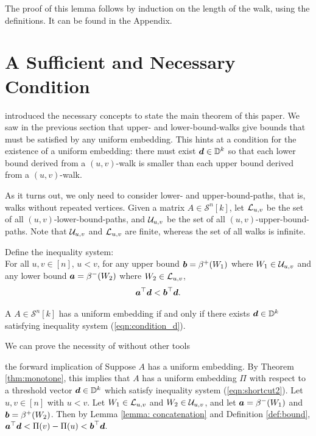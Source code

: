 \documentclass[runningheads]{llncs}
\begin{document}
The proof of this lemma follows by induction on the length of the walk, using the definitions. It can be found in the Appendix. 



%


\section{A Sufficient and Necessary Condition}\label{sec:main_thm}

 introduced the necessary concepts to state the main theorem of this paper. We saw in the previous section that upper- and lower-bound-walks give bounds that must be satisfied by any uniform embedding. This hints at a condition for the existence of a uniform embedding: there must exist $\boldsymbol d\in\mathbb D^k$ so that each lower bound derived from a $(u,v)$-walk is smaller than each upper bound derived from a $(u,v)$-walk. 

As it turns out, we only need to consider lower- and upper-bound-paths, that is, walks without repeated vertices. 
Given a matrix $A\in \mathcal{S}^n[k]$, let $\mathcal{L}_{u,v}$ be the set of all $(u,v)$-lower-bound-paths, and $\mathcal{U}_{u,v}$ be the set of all $(u,v)$-upper-bound-paths. Note that $\mathcal{U}_{u,v}$ and $\mathcal{L}_{u,v}$ are finite, whereas the set of all walks is infinite. 

Define the inequality system:\\
For all $u,v\in [n]$, $u<v$, for any upper bound $\boldsymbol b=\beta^+(W_1)$ where $W_1\in \mathcal{U}_{u,v}$ and any lower bound $\boldsymbol a=\beta^-(W_2)$ where $W_2\in\mathcal{L}_{u,v}$,
\begin{equation}\label{eqn:condition_d}
 \boldsymbol a^\top\boldsymbol d<\boldsymbol b^\top\boldsymbol d.
\end{equation}


\begin{theorem}\label{thm:main theorem}
A \diagincmat{} $A\in \mathcal{S}^n[k]$ has a uniform embedding if and only if there exists $\boldsymbol d\in\mathbb D^k$ satisfying inequality system (\ref{eqn:condition_d}).
\end{theorem}



We can prove the necessity of  without other tools

\begin{proofof}{the forward implication of }
Suppose $A$ has a uniform embedding. By Theorem \ref{thm:monotone}, this implies that $A$ has a uniform embedding $\Pi$ with respect to a  threshold vector $\boldsymbol d\in\mathbb D^k$ which satisfy inequality system (\ref{eqn:shortcut2}). Let $u,v\in[n]$ with $u<v$. Let $W_1\in\mathcal{L}_{u,v}$ and $W_2\in \mathcal{U}_{u,v}$,  and let $\boldsymbol a =\beta^-(W_1)$ and $\boldsymbol b=\beta^+(W_2)$. Then by Lemma \ref{lemma: concatenation} and Definition \ref{def:bound}, 
$\boldsymbol a^\top\boldsymbol d<\Pi(v)-\Pi(u) < \boldsymbol b^\top\boldsymbol d.
$
\end{proofof}
\end{document}
